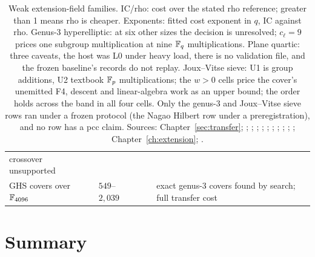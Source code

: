 \begin{table}[t]
\begin{tabularx}{\linewidth}{@{}>{\raggedright}p{2.4cm}>{\raggedright}p{1.5cm}>{\raggedright}p{2.6cm}>{\raggedright}p{1.7cm}>{\raggedright}p{1.8cm}>{\raggedright\arraybackslash}X@{}}
  crossover unsupported \\
\addlinespace
GHS covers over $\mathbb{F}_{4096}$ & & $549$--$2{,}039$ & & & exact genus-3
  covers found by search; full transfer cost \\
\bottomrule
\end{tabularx}
\caption[]{Weak extension-field families. IC/rho: cost over the stated rho
reference; greater than 1 means rho is cheaper. Exponents: fitted cost
exponent in $q$, IC against rho. Genus-3 hyperelliptic: at six other sizes
the decision is unresolved; $c_\ell=9$ prices one subgroup multiplication
at nine $\mathbb{F}_q$ multiplications. Plane quartic: three caveats, the host was
L0 under heavy load, there is no validation file, and the frozen baseline's
records do not replay. Joux--Vitse sieve: U1 is group additions, U2
textbook $\mathbb{F}_p$ multiplications; the $w>0$ cells price the cover's
unemitted F4, descent and linear-algebra work as an upper bound; the order
holds across the band in all four cells. Only the genus-3 and Joux--Vitse
sieve rows ran under a frozen protocol (the Nagao Hilbert row under a
preregistration), and no row has a pcc claim.
Sources: Chapter~\ref{sec:transfer};
;
;
;
;
;
;
;
;
;
;
Chapter~\ref{ch:extension};
.}
\label{tab:distance-weak}
\end{table}

\section{Summary}

